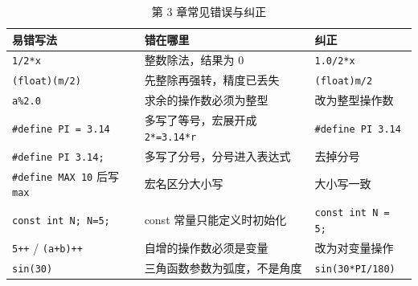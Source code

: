 \begin{table}[htbp]
\centering
\caption{第 3 章常见错误与纠正}
\small
\begin{tabularx}{\textwidth}{@{}lXl@{}}
\toprule
易错写法 & 错在哪里 & 纠正 \\
\midrule
\texttt{1/2*x} & 整数除法，结果为 0 & \texttt{1.0/2*x} \\
\texttt{(float)(m/2)} & 先整除再强转，精度已丢失 & \texttt{(float)m/2} \\
\texttt{a\%2.0} & 求余的操作数必须为整型 & 改为整型操作数 \\
\texttt{\#define PI = 3.14} & 多写了等号，宏展开成 \texttt{2*=3.14*r} & \texttt{\#define PI 3.14} \\
\texttt{\#define PI 3.14;} & 多写了分号，分号进入表达式 & 去掉分号 \\
\texttt{\#define MAX 10} 后写 \texttt{max} & 宏名区分大小写 & 大小写一致 \\
\texttt{const int N; N=5;} & const 常量只能定义时初始化 & \texttt{const int N = 5;} \\
\texttt{5++} / \texttt{(a+b)++} & 自增的操作数必须是变量 & 改为对变量操作 \\
\texttt{sin(30)} & 三角函数参数为弧度，不是角度 & \texttt{sin(30*PI/180)} \\
\bottomrule
\end{tabularx}
\end{table}
